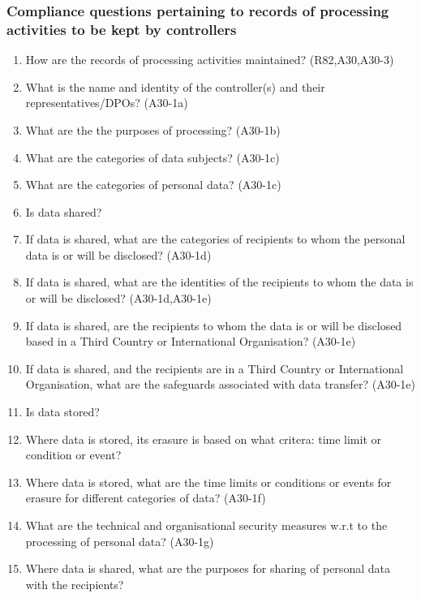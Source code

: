 \subsubsection{Compliance questions pertaining to records of processing activities to be kept by controllers}
\begin{enumerate}[label={\textit{CMQ.\theenumi}}]
    \item How are the records of processing activities maintained? (R82,A30,A30-3)
    \item What is the name and identity of the controller(s) and their representatives/DPOs? (A30-1a)
    \item What are the the purposes of processing? (A30-1b)
    \item What are the categories of data subjects? (A30-1c)
    \item What are the categories of personal data? (A30-1c)
    \item Is data shared?
    \item If data is shared, what are the categories of recipients to whom the personal data is or will be disclosed? (A30-1d)
    \item If data is shared, what are the identities of the recipients to whom the data is or will be disclosed? (A30-1d,A30-1e)
    \item If data is shared, are the recipients to whom the data is or will be disclosed based in a Third Country or International Organisation? (A30-1e)
    \item If data is shared, and the recipients are in a Third Country or International Organisation, what are the safeguards associated with data transfer? (A30-1e)
    \item Is data stored?
    \item Where data is stored, its erasure is based on what critera: time limit or condition or event?
    \item Where data is stored, what are the time limits or conditions or events for erasure for different categories of data? (A30-1f)
    \item What are the technical and organisational security measures w.r.t to the processing of personal data? (A30-1g)
    \item Where data is shared, what are the purposes for sharing of personal data with the recipients?
\end{enumerate}


